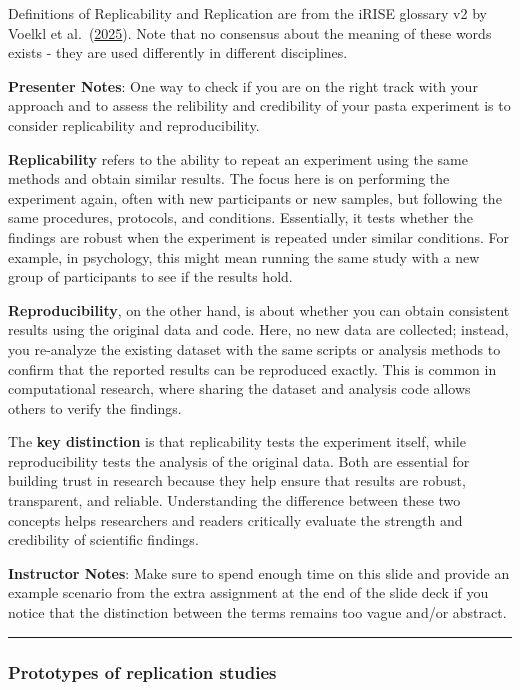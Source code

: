\documentclass[
  english,
  letterpaper,
  DIV=11,
  numbers=noendperiod]{scrartcl}
\begin{document}
Definitions of Replicability and Replication are from the iRISE glossary
v2 by Voelkl et al.~(\href{https://osf.io/br9sp/files/nmwr3}{2025}).
Note that no consensus about the meaning of these words exists - they
are used differently in different disciplines.

\textbf{Presenter Notes}: One way to check if you are on the right track
with your approach and to assess the relibility and credibility of your
pasta experiment is to consider replicability and reproducibility.

\textbf{Replicability} refers to the ability to repeat an experiment
using the same methods and obtain similar results. The focus here is on
performing the experiment again, often with new participants or new
samples, but following the same procedures, protocols, and conditions.
Essentially, it tests whether the findings are robust when the
experiment is repeated under similar conditions. For example, in
psychology, this might mean running the same study with a new group of
participants to see if the results hold.

\textbf{Reproducibility}, on the other hand, is about whether you can
obtain consistent results using the original data and code. Here, no new
data are collected; instead, you re-analyze the existing dataset with
the same scripts or analysis methods to confirm that the reported
results can be reproduced exactly. This is common in computational
research, where sharing the dataset and analysis code allows others to
verify the findings.

The \textbf{key distinction} is that replicability tests the experiment
itself, while reproducibility tests the analysis of the original data.
Both are essential for building trust in research because they help
ensure that results are robust, transparent, and reliable. Understanding
the difference between these two concepts helps researchers and readers
critically evaluate the strength and credibility of scientific findings.

\textbf{Instructor Notes}: Make sure to spend enough time on this slide
and provide an example scenario from the extra assignment at the end of
the slide deck if you notice that the distinction between the terms
remains too vague and/or abstract.

\begin{center}\rule{0.5\linewidth}{0.5pt}\end{center}

\subsubsection{Prototypes of replication
studies}\label{prototypes-of-replication-studies}
\end{document}
